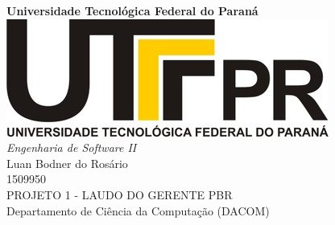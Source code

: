 \documentclass[12pt,a4paper,final]{article}
\begin{document}
      	\begin{titlepage}
       	\LARGE
       	\begin{center}
       	\vspace{5cm} 
       	\textbf{Universidade Tecnológica Federal do Paraná \\ \vspace{1.8cm}}
       	\includegraphics[scale=0.35]{logoutfpr.jpg} \\ \vspace{1.8cm}
       	\textit{Engenharia de Software II} \vspace{2cm} \\
       	Luan Bodner do Rosário \\ 1509950 \vspace{2cm} \\ 
       	PROJETO 1 - LAUDO DO GERENTE PBR \vspace{2cm} \\
      	Departamento de Ciência da Computação (DACOM) 
       	
   	\end{center}
    \end{titlepage}	

\tableofcontents
\newpage
\end{document}
